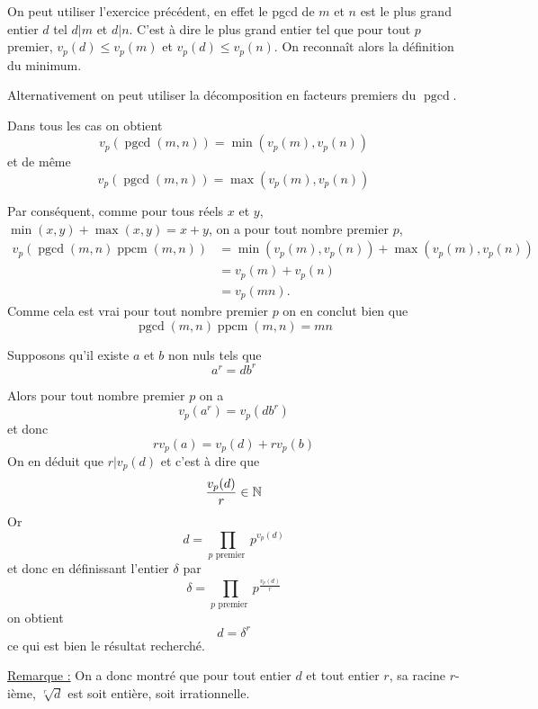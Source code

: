 \begin{sol}
On peut utiliser l'exercice précédent, en effet le pgcd de $m$ et $n$ est le plus grand entier $d$ tel $d |m$ et $d| n$. C'est à dire le plus grand entier tel que pour tout $p$ premier, $v_p(d)\le v_p(m)$ et $v_p(d) \le v_p(n)$. On reconnaît alors la définition du minimum.

Alternativement on peut utiliser la décomposition en facteurs premiers du $\operatorname{pgcd}$.

Dans tous les cas on obtient
$$\boxed{v_p\left(\operatorname{pgcd}(m,n)\right) = \min \left(v_p(m),v_p(n)\right)}$$
et de même
$$\boxed{v_p\left(\operatorname{pgcd}(m,n)\right) = \max \left(v_p(m),v_p(n)\right)}$$

Par conséquent, comme pour tous réels $x$ et $y$, $\min(x,y) + \max(x,y) = x + y$, on a pour tout nombre premier $p$,
$$\begin{aligned}
        v_p(\operatorname{pgcd}(m,n) \operatorname{ppcm}(m,n)) & = \min \left(v_p(m),v_p(n)\right) + \max \left(v_p(m),v_p(n)\right) \\
                                    & = v_p(m) + v_p(n)                                                  \\
                                    & = v_p(mn).
    \end{aligned}$$
Comme cela est vrai pour tout nombre premier $p$ on en conclut bien que
$$\boxed{\operatorname{pgcd}(m,n) \operatorname{ppcm}(m,n) = m n}$$
\end{sol}


\begin{sol}
Supposons qu'il existe $a$ et $b$ non nuls tels que
$$a^r = d b^r$$

Alors pour tout nombre premier $p$ on a
$$v_p(a^r) = v_p(d b^r)$$
et donc
$$r v_p(a) = v_p(d) + r v_p(b)$$
On en déduit que $r | v_p(d)$ et c'est à dire que
$$\frac{v_p(d)}{r} \in \mathbb N$$
Or
$$ d = \prod_{ p \text{ premier }} p^{v_p(d)}$$
et donc en définissant l'entier $\delta$ par
$$ \delta = \prod_{ p \text{ premier }} p^{\frac{v_p(d)}{r}}$$
on obtient
$$ \boxed{d = \delta^r}$$
ce qui est bien le résultat recherché.

\underline{Remarque :}
On a donc montré que pour tout entier $d$ et tout entier $r$, sa racine $r$-ième,  $\sqrt[r]{d}$ est soit entière, soit irrationnelle.
\end{sol}


